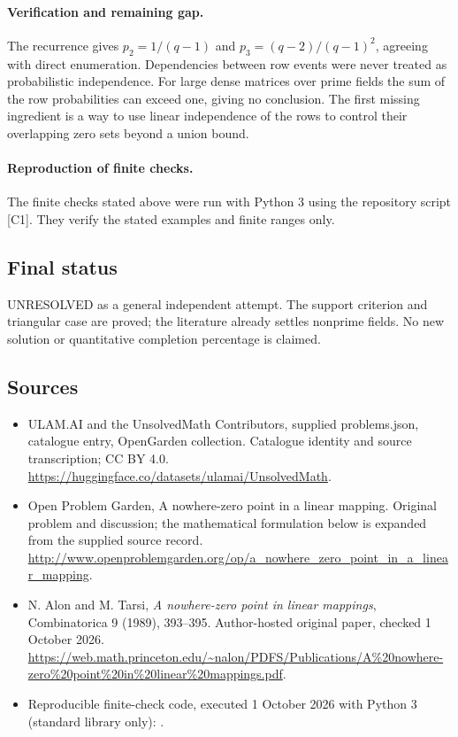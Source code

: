 \documentclass[11pt,a4paper]{article}
\begin{document}
\paragraph{Verification and remaining gap.}
The recurrence gives $p_2=1/(q-1)$ and
$p_3=(q-2)/(q-1)^2$, agreeing with direct enumeration. Dependencies
between row events were never treated as probabilistic independence.
For large dense matrices over prime fields the sum of the row
probabilities can exceed one, giving no conclusion. The first missing
ingredient is a way to use linear independence of the rows to control
their overlapping zero sets beyond a union bound.

\paragraph{Reproduction of finite checks.}
The finite checks stated above were run with Python 3 using the repository
script [C1]. They verify the stated examples and finite ranges only.

\subsection{Final status}
UNRESOLVED as a general independent attempt. The support criterion and
triangular case are proved; the literature already settles nonprime
fields. No new solution or quantitative completion percentage is claimed.

\subsection{Sources}
\begin{itemize}
\item[S1] ULAM.AI and the UnsolvedMath Contributors, supplied problems.json, catalogue entry, OpenGarden collection. Catalogue identity and source transcription; CC BY 4.0.
\url{https://huggingface.co/datasets/ulamai/UnsolvedMath}.
\item[S2] Open Problem Garden, A nowhere-zero point in a linear mapping. Original problem and discussion; the mathematical formulation below is expanded from the supplied source record.
\url{http://www.openproblemgarden.org/op/a_nowhere_zero_point_in_a_linear_mapping}.
\item[S3] N. Alon and M. Tarsi, \emph{A nowhere-zero point in linear mappings}, Combinatorica 9 (1989), 393--395. Author-hosted original paper, checked 1 October 2026.
\url{https://web.math.princeton.edu/~nalon/PDFS/Publications/A%20nowhere-zero%20point%20in%20linear%20mappings.pdf}.
\item[C1] Reproducible finite-check code, executed 1 October 2026 with Python 3 (standard library only):
.
\end{itemize}
\end{document}
